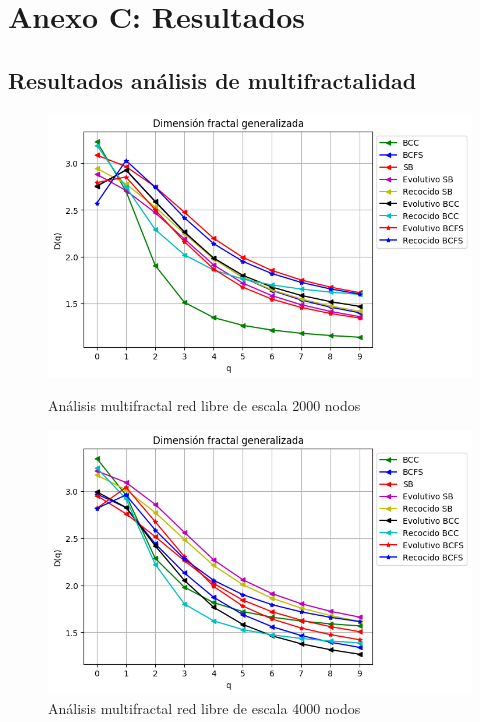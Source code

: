 \newpage
\section*{Anexo C: Resultados}
 \label{AnexoC}

\subsection*{Resultados análisis de multifractalidad}


\begin{figure}[!htb]
    \begin{minipage}{0.48\textwidth}
        \centering
        \includegraphics[scale=0.5]{CapituloAAnexos/imagenesAnexoC/Fractalidad/grafica_Dq20180502_203759ScaleFree2000Nodes.png}
        \caption{Análisis multifractal red libre de escala 2000 nodos}
    \end{minipage}\hfill
   \begin{minipage}{0.48\textwidth}
         \centering
        \includegraphics[scale=0.5]{CapituloAAnexos/imagenesAnexoC/Fractalidad/grafica_Dq20180506_035455ScaleFree4000Nodes.png}
    \caption{Análisis multifractal red libre de escala 4000 nodos}
    \end{minipage}
\end{figure}


